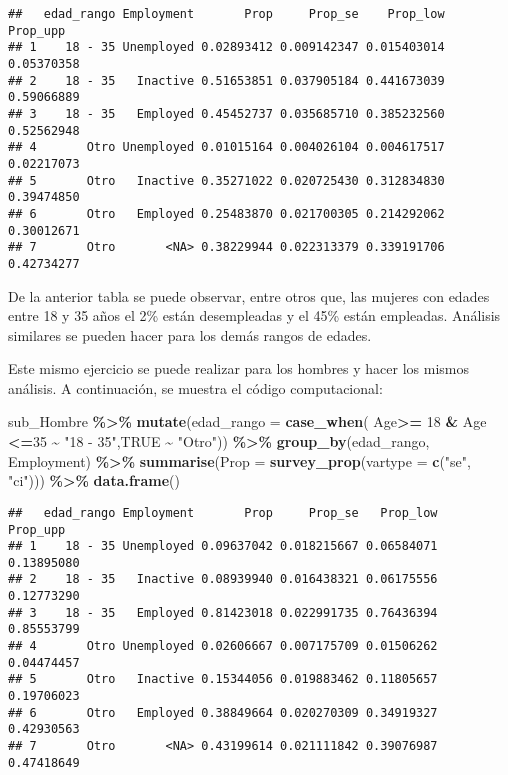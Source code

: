 \documentclass[
  12pt,
]{book}
\newenvironment{Shaded}{\begin{snugshade}}{\end{snugshade}}
\newcommand{\AttributeTok}[1]{\textcolor[rgb]{0.13,0.29,0.53}{#1}}
\newcommand{\ConstantTok}[1]{\textcolor[rgb]{0.56,0.35,0.01}{#1}}
\newcommand{\DecValTok}[1]{\textcolor[rgb]{0.00,0.00,0.81}{#1}}
\newcommand{\FunctionTok}[1]{\textcolor[rgb]{0.13,0.29,0.53}{\textbf{#1}}}
\newcommand{\NormalTok}[1]{#1}
\newcommand{\SpecialCharTok}[1]{\textcolor[rgb]{0.81,0.36,0.00}{\textbf{#1}}}
\newcommand{\StringTok}[1]{\textcolor[rgb]{0.31,0.60,0.02}{#1}}
\begin{document}
\begin{verbatim}
##   edad_rango Employment       Prop     Prop_se    Prop_low   Prop_upp
## 1    18 - 35 Unemployed 0.02893412 0.009142347 0.015403014 0.05370358
## 2    18 - 35   Inactive 0.51653851 0.037905184 0.441673039 0.59066889
## 3    18 - 35   Employed 0.45452737 0.035685710 0.385232560 0.52562948
## 4       Otro Unemployed 0.01015164 0.004026104 0.004617517 0.02217073
## 5       Otro   Inactive 0.35271022 0.020725430 0.312834830 0.39474850
## 6       Otro   Employed 0.25483870 0.021700305 0.214292062 0.30012671
## 7       Otro       <NA> 0.38229944 0.022313379 0.339191706 0.42734277
\end{verbatim}

De la anterior tabla se puede observar, entre otros que, las mujeres con edades entre 18 y 35 años el 2\% están desempleadas y el 45\% están empleadas. Análisis similares se pueden hacer para los demás rangos de edades.

Este mismo ejercicio se puede realizar para los hombres y hacer los mismos análisis. A continuación, se muestra el código computacional:

\begin{Shaded}
\begin{Highlighting}[]
\NormalTok{sub\_Hombre }\SpecialCharTok{\%\textgreater{}\%} \FunctionTok{mutate}\NormalTok{(}\AttributeTok{edad\_rango =} \FunctionTok{case\_when}\NormalTok{(}
\NormalTok{                      Age}\SpecialCharTok{\textgreater{}=} \DecValTok{18} \SpecialCharTok{\&}\NormalTok{ Age }\SpecialCharTok{\textless{}=}\DecValTok{35}  \SpecialCharTok{\textasciitilde{}} \StringTok{"18 {-} 35"}\NormalTok{,}\ConstantTok{TRUE} \SpecialCharTok{\textasciitilde{}} \StringTok{"Otro"}\NormalTok{)) }\SpecialCharTok{\%\textgreater{}\%}
                      \FunctionTok{group\_by}\NormalTok{(edad\_rango, Employment) }\SpecialCharTok{\%\textgreater{}\%} 
                      \FunctionTok{summarise}\NormalTok{(}\AttributeTok{Prop =} \FunctionTok{survey\_prop}\NormalTok{(}\AttributeTok{vartype =}  \FunctionTok{c}\NormalTok{(}\StringTok{"se"}\NormalTok{, }\StringTok{"ci"}\NormalTok{))) }\SpecialCharTok{\%\textgreater{}\%} 
                      \FunctionTok{data.frame}\NormalTok{()}
\end{Highlighting}
\end{Shaded}

\begin{verbatim}
##   edad_rango Employment       Prop     Prop_se   Prop_low   Prop_upp
## 1    18 - 35 Unemployed 0.09637042 0.018215667 0.06584071 0.13895080
## 2    18 - 35   Inactive 0.08939940 0.016438321 0.06175556 0.12773290
## 3    18 - 35   Employed 0.81423018 0.022991735 0.76436394 0.85553799
## 4       Otro Unemployed 0.02606667 0.007175709 0.01506262 0.04474457
## 5       Otro   Inactive 0.15344056 0.019883462 0.11805657 0.19706023
## 6       Otro   Employed 0.38849664 0.020270309 0.34919327 0.42930563
## 7       Otro       <NA> 0.43199614 0.021111842 0.39076987 0.47418649
\end{verbatim}
\end{document}
